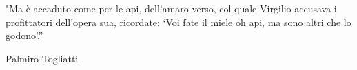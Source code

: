 \documentclass[./dissertation.tex]{subfiles}
\begin{document}
\newpage

\vspace{10cm}
"Ma è accaduto come per le api, dell’amaro verso, col quale Virgilio accusava i profittatori dell’opera sua, ricordate: ‘Voi fate il miele oh api, ma sono altri che lo godono’.”


\raggedright{Palmiro Togliatti}
\newpage
 
\end{document}

